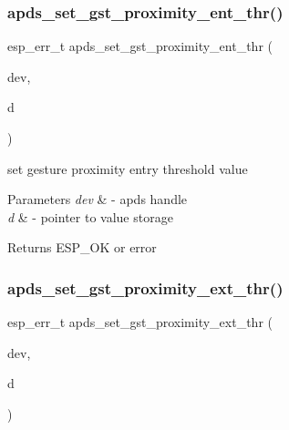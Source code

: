 \subsubsection{\texorpdfstring{apds\+\_\+set\+\_\+gst\+\_\+proximity\+\_\+ent\+\_\+thr()}{apds\_set\_gst\_proximity\_ent\_thr()}}
{\footnotesize\ttfamily esp\+\_\+err\+\_\+t apds\+\_\+set\+\_\+gst\+\_\+proximity\+\_\+ent\+\_\+thr (\begin{DoxyParamCaption}\item[{\hyperlink{structAPDS9960__Driver}{A\+P\+D\+S\+\_\+\+D\+EV}}]{dev,  }\item[{\hyperlink{vl53l0x__types_8h_aba7bc1797add20fe3efdf37ced1182c5}{uint8\+\_\+t} $\ast$}]{d }\end{DoxyParamCaption})}




\begin{DoxyItemize}
\item set gesture proximity entry threshold value 
\end{DoxyItemize}


\begin{DoxyParams}{Parameters}
{\em dev} & -\/ apds handle \\
\hline
{\em d} & -\/ pointer to value storage \\
\hline
\end{DoxyParams}
\begin{DoxyReturn}{Returns}
E\+S\+P\+\_\+\+OK or error 
\end{DoxyReturn}
\mbox{\label{group__APDS9960__GestureFunctions_ga4cecc0f8dc5e34be6b8838d2a36d9690}} 
\subsubsection{\texorpdfstring{apds\+\_\+set\+\_\+gst\+\_\+proximity\+\_\+ext\+\_\+thr()}{apds\_set\_gst\_proximity\_ext\_thr()}}
{\footnotesize\ttfamily esp\+\_\+err\+\_\+t apds\+\_\+set\+\_\+gst\+\_\+proximity\+\_\+ext\+\_\+thr (\begin{DoxyParamCaption}\item[{\hyperlink{structAPDS9960__Driver}{A\+P\+D\+S\+\_\+\+D\+EV}}]{dev,  }\item[{\hyperlink{vl53l0x__types_8h_aba7bc1797add20fe3efdf37ced1182c5}{uint8\+\_\+t} $\ast$}]{d }\end{DoxyParamCaption})}




